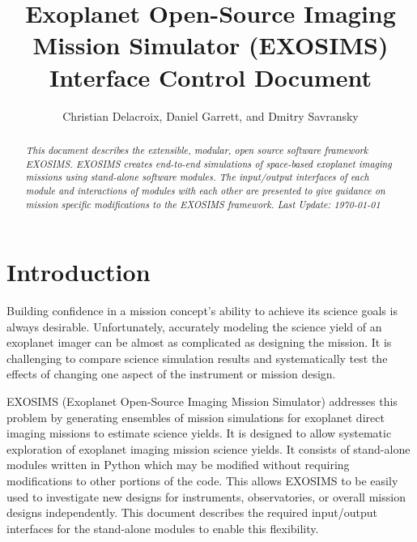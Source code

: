 \documentclass[cleanfoot]{asme2ej}
\title{Exoplanet Open-Source Imaging Mission Simulator (EXOSIMS) \\ Interface Control Document}
\author{Christian Delacroix, Daniel Garrett, and Dmitry Savransky
    \affiliation{
    Sibley School of Mechanical and Aerospace Engineering\\
	Cornell University\\
	Ithaca, NY 14853
    }	
}
\begin{document}
\maketitle    

\begin{abstract}
{\it This document describes the extensible, modular, open source software framework EXOSIMS.  EXOSIMS creates end-to-end simulations of space-based exoplanet imaging missions using stand-alone software modules.  The input/output interfaces of each module and interactions of modules with each other are presented to give guidance on mission specific modifications to the EXOSIMS framework. Last Update: \today}
\end{abstract}

\tableofcontents

\begin{nomenclature}
\end{nomenclature}


\section{Introduction} 
Building confidence in a mission concept's ability to achieve its science goals is always desirable.  Unfortunately, accurately modeling the science yield of an exoplanet imager can be almost as complicated as designing the mission.  It is challenging to compare science simulation results and systematically test the effects of changing one aspect of the instrument or mission design.

EXOSIMS (Exoplanet Open-Source Imaging Mission Simulator) addresses this problem by generating ensembles of mission simulations for exoplanet direct imaging missions to estimate science yields. It is designed to allow systematic exploration of exoplanet imaging mission science yields.  It consists of stand-alone modules written in Python which may be modified without requiring modifications to other portions of the code. This allows EXOSIMS to be easily used to investigate new designs for instruments, observatories, or overall mission designs independently. This document describes the required input/output interfaces for the stand-alone modules to enable this flexibility.
\end{document}
